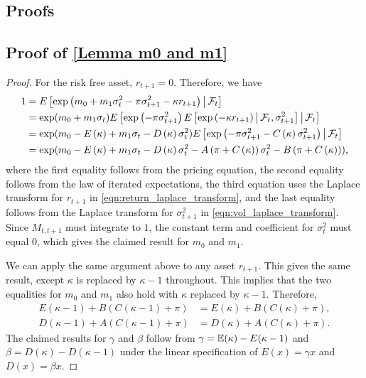 \documentclass[11pt, letterpaper, twoside]{article}
\begin{document}
\begin{appendices}

\section{Proofs}\label{sec:proofs}


\subsection{\texorpdfstring{Proof of \cref{Lemma m0 and m1}}{Proof of Lemma 1}}

\begin{proof}
For the risk free asset, $ r_{t+1}=0.$ 
Therefore, we have
%
\begin{align}
    1 &= E\left[ \exp \left( m_{0}+m_{1}\sigma _{t}^{2}-\pi \sigma _{t+1}^{2}-\kappa r_{t+1}\right) \mvert \F_{t}\right] \nonumber  \\
%
    &= \exp (m_{0}+m_{1}\sigma _{t})E\left[ \exp \left( -\pi \sigma _{t+1}^{2}\right) E\left[ \exp \left( -\kappa r_{t+1}\right) \mvert \F _{t},\sigma _{t+1}^{2}\right] \mvert \F_{t}\right]  \nonumber \\
%
    &= \exp (m_{0}-E\left( \kappa \right) +m_{1}\sigma _{t}-D\left( \kappa \right) \sigma _{t}^{2})E\left[ \exp \left( -\pi \sigma _{t+1}^{2}-C\left( \kappa \right) \sigma _{t+1}^{2}\right) \mvert \F_{t}\right]  \nonumber \\
%
    &= \exp (m_{0}-E\left( \kappa \right) +m_{1}\sigma _{t}-D\left( \kappa \right) \sigma _{t}^{2}-A\left( \pi +C\left( \kappa \right) \right) \sigma _{t}^{2}-B\left( \pi +C\left( \kappa \right) \right) ),
%
\end{align}
%
where the first equality follows from the pricing equation, the second equality follows from the law of iterated expectations, the third equation uses the Laplace transform for $r_{t+1}$ in \cref{eqn:return_laplace_transform}, and the last equality follows from the Laplace transform for $\sigma _{t+1}^{2}$ in \cref{eqn:vol_laplace_transform}. 
Since $M_{t,t+1}$ must integrate to $1$, the constant term and coefficient for $\sigma_{t}^{2}$ must equal 0, which gives the claimed result for $m_{0}$ and $m_{1}$.

We can apply the same argument above to any asset $r_{t+1}$. This gives the same result, except $\kappa$ is replaced by $\kappa -1$ throughout. 
This implies that the two equalities for $m_{0}$ and $m_{1}$ also hold with $\kappa $ replaced by $\kappa -1$. 
Therefore, 
%
\begin{align}
    E(\kappa -1)+B\left( C\left( \kappa -1\right) +\pi \right)  
%
    &= E(\kappa)+B\left( C\left( \kappa \right) +\pi \right), \nonumber \\
%
    D\left( \kappa -1\right) +A\left( C\left( \kappa -1\right) +\pi \right) 
%
    &= D\left( \kappa \right) +A\left( C\left( \kappa \right) +\pi \right).
\end{align}
%
The claimed results for $\gamma $ and $\beta $ follow from $\gamma = \operatorname{\mathbb{E}}(\kappa)-E(\kappa -1)$ and $\beta =D(\kappa )-D(\kappa -1)$ under the linear specification of $E(x)=\gamma x$ and $D(x)=\beta x$.


\end{proof}
\end{appendices}
\end{document}
